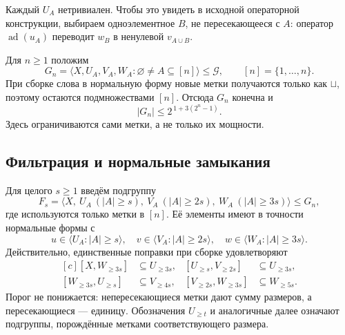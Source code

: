 \documentclass[11pt,a4paper]{article}
\theoremstyle{definition}
\theoremstyle{remark}
\newcommand{\ad}{\operatorname{ad}}
\begin{document}
Каждый \(U_A\) нетривиален. Чтобы это увидеть в исходной
операторной конструкции, выбираем одноэлементное \(B\),
не пересекающееся с \(A\): оператор \(\ad(u_A)\)
переводит \(w_B\) в ненулевой \(v_{A\cup B}\).

Для \(n\ge1\) положим
\[
 G_n=\langle X,U_A,V_A,W_A:\varnothing\ne A\subseteq[n]\rangle
 \le\mathscr G,\qquad [n]=\{1,\ldots,n\}.
\]
При сборке слова в нормальную форму новые метки получаются
только как \(\sqcup\), поэтому остаются подмножествами \([n]\).
Отсюда \(G_n\) конечна и
\begin{equation}\label{eq:sizefirst}
 |G_n|\le2^{\,1+3(2^n-1)}.
\end{equation}
Здесь ограничиваются сами метки, а не только их мощности.

\subsection{Фильтрация и нормальные замыкания}

Для целого \(s\ge1\) введём подгруппу
\[
 F_s=\langle X,\ U_A\ (|A|\ge s),\
 V_A\ (|A|\ge2s),\ W_A\ (|A|\ge3s)\rangle\le G_n,
\]
где используются только метки в \([n]\).
Её элементы имеют в точности нормальные формы с
\[
 u\in\langle U_A:|A|\ge s\rangle,\quad
 v\in\langle V_A:|A|\ge2s\rangle,\quad
 w\in\langle W_A:|A|\ge3s\rangle.
\]
Действительно, единственные поправки при сборке удовлетворяют
\[
 \begin{aligned}[c]
 [X,W_{\ge3s}]&\subseteq U_{\ge3s},&
 [U_{\ge s},V_{\ge2s}]&\subseteq U_{\ge3s},\\
 [W_{\ge3s},U_{\ge s}]&\subseteq V_{\ge4s},&
 [V_{\ge2s},W_{\ge3s}]&\subseteq W_{\ge5s}.
 \end{aligned}
\]
Порог не понижается: непересекающиеся метки дают сумму размеров,
а пересекающиеся --- единицу. Обозначения \(U_{\ge t}\)
и аналогичные далее означают подгруппы, порождённые метками
соответствующего размера.
\end{document}
